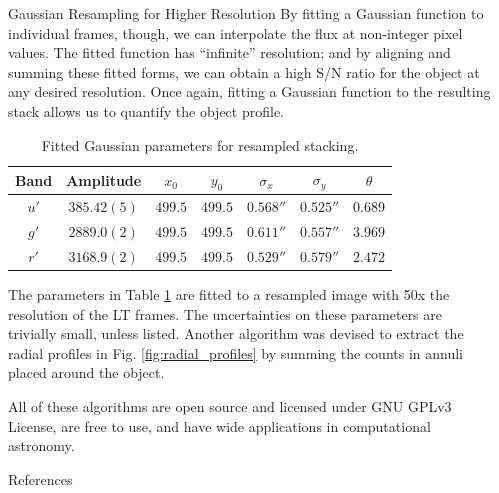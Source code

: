 \documentclass[final]{beamer}
\newlength{\sepwidth}
\newlength{\colwidth}
\newcommand{\separatorcolumn}{\begin{column}{\sepwidth}\end{column}}
\begin{document}
\begin{frame}[t]
\begin{columns}[t]
\begin{column}{\colwidth}
\begin{alertblock}{\LARGE Gaussian Resampling for Higher Resolution}
\Large By fitting a Gaussian function to individual frames, though, we can interpolate the flux at non-integer pixel values. The fitted function has ``infinite'' resolution; and by aligning and summing these fitted forms, we can obtain a high S/N ratio for the object at any desired resolution. Once again, fitting a Gaussian function to the resulting stack allows us to quantify the object profile.
\newline
\begin{table}[h!]
    \centering
    \begin{tabular}{| c | c | c | c | c | c | c |} \hline
        Band & Amplitude & $x_0$ & $y_0$ & $\sigma_x$ & $\sigma_y$ & $\theta$ \\ \hline \hline
        $u'$ & $385.42(5)$ & $499.5$ & $499.5$ & $0.568''$ & $0.525''$ & $0.689$ \\
        $g'$ & $2889.0(2)$ & $499.5$ & $499.5$ & $0.611''$ & $0.557''$ & $3.969$ \\
        $r'$ & $3168.9(2)$ & $499.5$ & $499.5$ & $0.529''$ & $0.579''$ & $2.472$ \\ \hline
    \end{tabular}
    \caption{\Large Fitted Gaussian parameters for resampled stacking.}
    \label{tab:resampled_gaussians}
\end{table}

The parameters in Table \ref{tab:resampled_gaussians} are fitted to a resampled image with 50x the resolution of the LT frames. The uncertainties on these parameters are trivially small, unless listed. Another algorithm was devised to extract the radial profiles in Fig. \ref{fig:radial_profiles} by summing the counts in annuli placed around the object.

All of these algorithms are open source and licensed under GNU GPLv3 License, are free to use, and have wide applications in computational astronomy.
\end{alertblock}

\begin{block}{\small References}
\small
\printbibliography
\end{block}

\end{column}

\separatorcolumn
\end{columns}
\end{frame}
\end{document}
